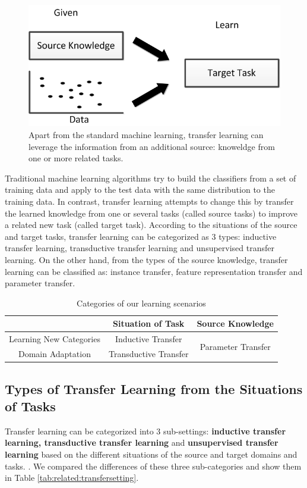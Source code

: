 \begin{figure}
	\centering
	\includegraphics[scale =.7]{relatedwork/fig/transfer.png}
	\caption{Apart from the standard machine learning, transfer learning can leverage the information from an additional source: knoweldge from one or more related tasks.}
\end{figure}

Traditional machine learning algorithms try to build the classifiers from a set of training data and apply to the test data with the same distribution to the training data. In contrast, transfer learning attempts to change this by transfer the learned knowledge from one or several tasks (called source tasks) to improve a related new task (called target task). According to the situations of the source and target tasks, transfer learning can be categorized as 3 types: inductive transfer learning, transductive transfer learning and {unsupervised transfer learning}. On the other hand, from the types of the source knowledge, transfer learning can be classified as: instance transfer, feature representation transfer and parameter transfer. 

\begin{table}[htbp]
	\centering
	\caption{Categories of our learning scenarios}
	\begin{tabular}{|c|c|c|}
	\hline
		& Situation of Task     & Source Knowledge \\
		\hline
		Learning New Categories & Inductive Transfer & \multirow{2}[0]{*}{Parameter Transfer} \\
		\cline{1-2}
		Domain Adaptation & Transductive Transfer &  \\
		\hline
	\end{tabular}%
\end{table}%


\subsection{Types of Transfer Learning from the Situations of Tasks}
Transfer learning can be categorized into 3 sub-settings: \textbf{inductive transfer learning, transductive transfer learning} and \textbf{unsupervised transfer learning} based on the different situations of the source and target domains and tasks. \cite{pan2010survey}. We compared the differences of these three sub-categories and show them in Table \ref{tab:related:transfersetting}. 

